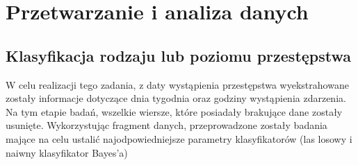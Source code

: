 \documentclass{classrep}
\begin{document}
    \section{Przetwarzanie i analiza danych} {

        \subsection{Klasyfikacja rodzaju lub poziomu przestępstwa} {
            W celu realizacji tego zadania, z daty wystąpienia przestępstwa wyekstrahowane zostały informacje dotyczące dnia tygodnia oraz godziny wystąpienia zdarzenia. Na tym etapie badań, wszelkie wiersze, które posiadały brakujące dane zostały usunięte. 
            Wykorzystując fragment danych, przeprowadzone zostały badania mające na celu ustalić najodpowiedniejsze parametry klasyfikatorów (las losowy i naiwny klasyfikator Bayes'a)
}}
\end{document}
